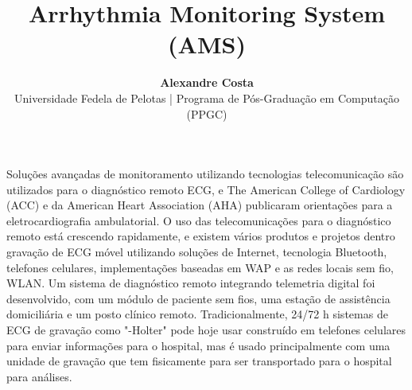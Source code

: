 \documentclass[a4paper,12pt]{article}
\title{\Large{\textbf{Arrhythmia Monitoring System (AMS)}}}
\author{\textbf{Alexandre Costa}\\
\normalsize{Universidade Fedela de Pelotas | Programa de Pós-Graduação em Computação (PPGC)}}
\date{\null}
\begin{document}
	\maketitle
	\thispagestyle{empty}
	\normalsize{
		Soluções avançadas de monitoramento utilizando tecnologias telecomunicação são utilizados para o diagnóstico remoto ECG, e The American College of Cardiology (ACC) e da American Heart Association (AHA) publicaram orientações para a eletrocardiografia ambulatorial. O uso das telecomunicações para o diagnóstico remoto está crescendo rapidamente, e existem vários produtos e projetos dentro gravação de ECG móvel utilizando soluções de Internet, tecnologia Bluetooth, telefones celulares, implementações baseadas em WAP e as redes locais sem fio, WLAN. Um sistema de diagnóstico remoto integrando telemetria digital foi desenvolvido, com um módulo de paciente sem fios, uma estação de assistência domiciliária e um posto clínico remoto. Tradicionalmente, 24/72 h sistemas de ECG de gravação como "-Holter" pode hoje usar construído em telefones celulares para enviar informações para o hospital, mas é usado principalmente com uma unidade de gravação que tem fisicamente para ser transportado para o hospital para análises.
	}
\end{document}
